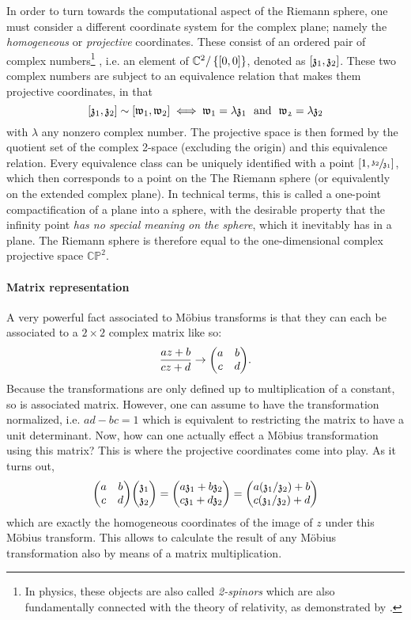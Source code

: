 In order to turn towards the computational aspect of the Riemann sphere, one must consider a different coordinate system for the complex plane; namely the \emph{homogeneous} or \emph{projective} coordinates. These consist of an ordered pair of complex numbers\footnote{In physics, these objects are also called \emph{2-spinors} which are also fundamentally connected with the theory of relativity, as demonstrated by \cite{Penrose1984}.} , i.e. an element of \(\mathbb{C}^2/\left\{[0, 0]\right\}\),  denoted as \(\qty[\mathfrak{z}_1, \mathfrak{z}_2]\). These two complex numbers are subject to an equivalence relation that makes them projective coordinates, in that \[\qty[\mathfrak{z}_1, \mathfrak{z}_2] \sim \qty[\mathfrak{w}_1, \mathfrak{w}_2] \iff \mathfrak{w}_1 = \lambda \mathfrak{z}_1\ \text{ and }\ \mathfrak{w_2} = \lambda \mathfrak{z}_2\]
with \(\lambda\) any nonzero complex number. The projective space is then formed by the quotient set of the complex 2-space (excluding the origin) and this equivalence relation. Every equivalence class can be uniquely identified with a point \([1, \sfrac{\mathfrak{z}_2}{\mathfrak{z}_1}]\), which then corresponds to a point on the The Riemann sphere (or equivalently on the extended complex plane). In technical terms, this is called a one-point compactification of a plane into a sphere, with the desirable property that the infinity point \emph{has no special meaning on the sphere}, which it inevitably has in a plane. The Riemann sphere is therefore equal to the one-dimensional complex projective space \(\mathbb{CP}^2\).

\paragraph{Matrix representation}
A very powerful fact associated to Möbius transforms is that they can each be associated to a \(2\times 2\) complex matrix like so:
\[ \frac{az + b}{cz + d} \rightarrow \mqty(a & b \\ c & d).\] 
Because the transformations are only defined up to multiplication of a constant, so is associated matrix. However, one can assume to have the transformation normalized, i.e. \(ad - bc = 1\) which is equivalent to restricting the matrix to have a unit determinant. Now, how can one actually effect a Möbius transformation using this matrix? This is where the projective coordinates come into play. As it turns out, 
\[ 
    \mqty(a & b\\ c & d)\mqty(\mathfrak{z}_1\\\mathfrak{z}_2)
    = \mqty(a\mathfrak{z}_1 + b\mathfrak{z}_2\\c\mathfrak{z}_1 + d\mathfrak{z}_2)
    =\mqty(a(\mathfrak{z}_1/\mathfrak{z}_2) + b\\c(\mathfrak{z}_1/\mathfrak{z}_2) + d)
\]
which are exactly the homogeneous coordinates of the image of \(z\) under this Möbius transform. This allows to calculate the result of any Möbius transformation also by means of a matrix multiplication.

